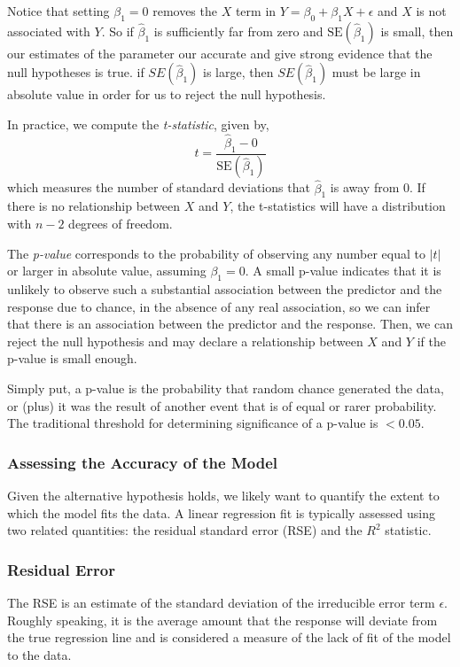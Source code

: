 \documentclass{article}
\numberwithin{equation}{section}
\begin{document}
Notice that setting $\beta_1 = 0$ removes the $X$ term in $Y = \beta_0 + \beta_1 X + \epsilon$ and $X$ is not associated with $Y$. So if $\hat \beta_1$ is sufficiently far from zero and $\text{SE}(\hat \beta_1)$ is small, then our estimates of the parameter our accurate and give strong evidence that the null hypotheses is true. if $SE(\hat\beta_1)$ is large, then $SE(\hat\beta_1)$ must be large in absolute value in order for us to reject the null hypothesis.

In practice, we compute the \textit{t-statistic}, given by,
\begin{equation}
    t = \frac{\hat \beta_1 - 0}{\text{SE}(\hat \beta_1)}
\end{equation}
which measures the number of standard deviations that $\hat \beta_1$ is away from 0. If there is no relationship between $X$ and $Y$, the t-statistics will have a distribution with $n - 2$ degrees of freedom. 

The \textit{p-value} corresponds to the probability of observing any number equal to $|t|$ or larger in absolute value, assuming $\beta_1= 0$. A small p-value indicates that it is unlikely to observe such a substantial association between the predictor and the response due to chance, in the absence of any real association, so we can infer that there is an association between the predictor and the response. Then, we can reject the null hypothesis and may declare a relationship between $X$ and $Y$ if the p-value is small enough.

Simply put, a p-value is the probability that random chance generated the data, or (plus) it was the result of another event that is of equal or rarer probability. The traditional threshold for determining significance of a p-value is $< 0.05$.

\subsubsection{Assessing the Accuracy of the Model}
Given the alternative hypothesis holds, we likely want to quantify the extent to which the model fits the data. A linear regression fit is typically assessed using two related quantities: the residual standard error (RSE) and the $R^2$ statistic.

\subsubsection*{Residual Error}
The RSE is an estimate of the standard deviation of the irreducible error term $\epsilon$. Roughly speaking, it is the average amount that the response
will deviate from the true regression line and is considered a measure of the lack of fit of the model to the data. 
\end{document}
